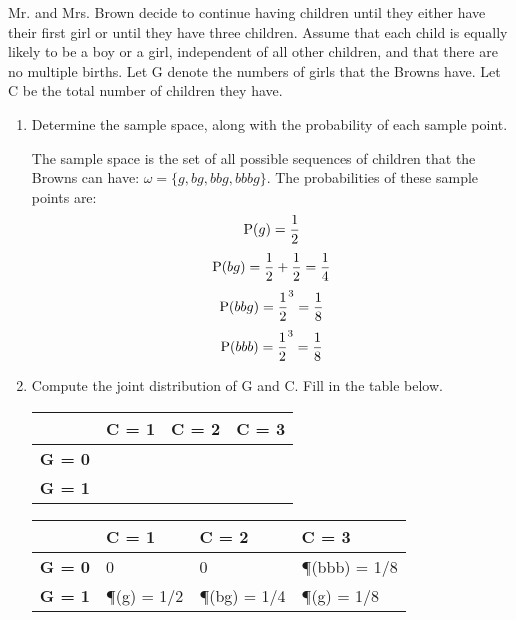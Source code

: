 \question Mr. and Mrs. Brown decide to continue having children until they either have their first girl or until
they have three children. Assume that each child is equally likely to be a boy or a girl, independent
of all other children, and that there are no multiple births. Let G denote the numbers of girls that
the Browns have. Let C be the total number of children they have.

\begin{enumerate}[label=(\alph*)]
\item Determine the sample space, along with the probability of each sample point.
\begin{solution}[.75 cm]
The sample space is the set of all possible sequences of children that the Browns can have: $\omega = \{g, bg, bbg, bbbg\}$. The probabilities of these sample points are:
\[\P(g) = \frac{1}{2}\]
\[\P(bg) = \frac{1}{2} + \frac{1}{2} = \frac{1}{4}\]
\[\P(bbg) = {\frac{1}{2}}^3= \frac{1}{8}\]
\[\P(bbb) = {\frac{1}{2}}^3= \frac{1}{8}\]
\end{solution}

\item Compute the joint distribution of G and C. Fill in the table below.
\begin{center}
\begin{tabular}{|l|l|l|l|}
\hline
\textbf{}      & \textbf{C = 1} & \textbf{C = 2} & \textbf{C = 3} \\ \hline
\textbf{G = 0} &                &                &                \\ \hline
\textbf{G = 1} &                &                &                \\ \hline
\end{tabular}
\end{center}
\begin{solution}[.75 cm]
\begin{center}
\begin{tabular}{|l|l|l|l|}
\hline
\textbf{}      & \textbf{C = 1}             & \textbf{C = 2} & \textbf{C = 3} \\ \hline
\textbf{G = 0} & 0                          & 0              & \P(bbb) = 1/8   \\ \hline
\textbf{G = 1} & \P(g) = 1/2 & \P(bg) = 1/4    & \P(g) = 1/8     \\ \hline
\end{tabular}
\end{center}
\end{solution}


\end{enumerate}
